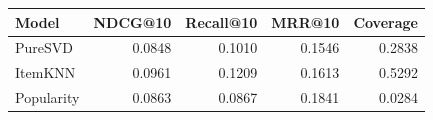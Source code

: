 \begin{tabular}{lrrrr}
\toprule
Model & NDCG@10 & Recall@10 & MRR@10 & Coverage \\
\midrule
PureSVD & 0.0848 & 0.1010 & 0.1546 & 0.2838 \\
ItemKNN & 0.0961 & 0.1209 & 0.1613 & 0.5292 \\
Popularity & 0.0863 & 0.0867 & 0.1841 & 0.0284 \\
\bottomrule
\end{tabular}
